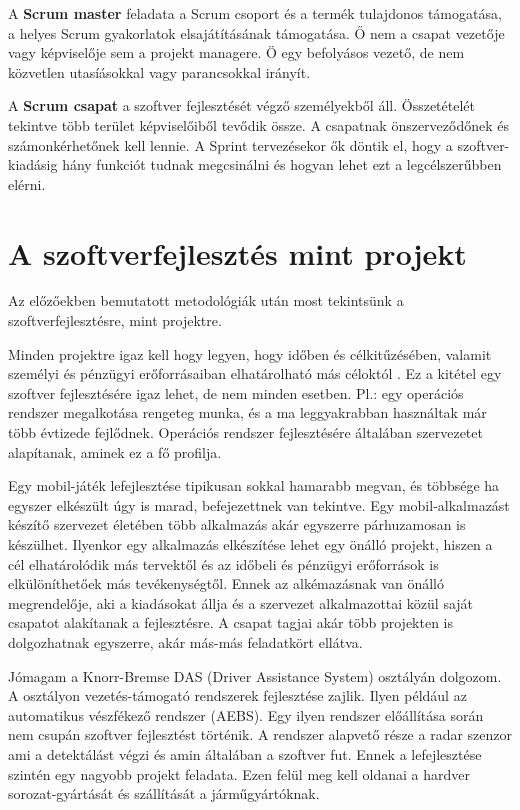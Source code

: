 \documentclass[a4paper,12pt,leqno, notitlepage]{article}%
\begin{document}
A \textbf{Scrum master} feladata a Scrum csoport és a termék tulajdonos támogatása, a helyes Scrum gyakorlatok elsajátításának támogatása. Ő nem a csapat vezetője vagy képviselője sem a projekt managere. Ö egy befolyásos vezető, de nem közvetlen utasíásokkal vagy parancsokkal irányít. \cite{scrum_roles}

A \textbf{Scrum csapat} a szoftver fejlesztését végző személyekből áll. Összetételét tekintve több terület képviselőiből tevődik össze. A csapatnak önszerveződőnek és számonkérhetőnek kell lennie. A Sprint tervezésekor ők döntik el, hogy a szoftver-kiadásig hány funkciót tudnak megcsinálni és hogyan lehet ezt a legcélszerűbben elérni.\cite{scrum_roles}
 
\section{A szoftver\-fejlesztés mint projekt}

Az előzőekben bemutatott metodológiák után most tekintsünk a szoftverfejlesztésre, mint projektre.

Minden projektre igaz kell hogy legyen, hogy időben és célkitűzésében, valamit személyi és pénzügyi erőforrásaiban elhatárolható más céloktól \cite{proj_fogalom}. Ez a kitétel egy szoftver fejlesztésére igaz lehet, de nem minden esetben. Pl.: egy operációs rendszer megalkotása rengeteg munka, és a ma leggyakrabban használtak már több évtizede fejlődnek. Operációs rendszer fejlesztésére általában szervezetet alapítanak, aminek ez a fő profilja. 

Egy mobil-játék lefejlesztése tipikusan sokkal hamarabb megvan, és többsége ha egyszer elkészült úgy is marad, befejezettnek van tekintve. Egy mobil-alkalmazást készítő szervezet életében több alkalmazás akár egyszerre párhuzamosan is készülhet. Ilyenkor egy alkalmazás elkészítése lehet egy önálló projekt, hiszen a cél elhatárolódik más tervektől és az időbeli  és pénzügyi erőforrások is elkülöníthetőek más tevékenységtől. Ennek az alkémazásnak van önálló megrendelője, aki a kiadásokat állja és a szervezet alkalmazottai közül saját csapatot alakítanak a fejlesztésre. A csapat tagjai akár több projekten is dolgozhatnak egyszerre, akár más-más feladatkört ellátva.

Jómagam a Knorr-Bremse DAS (Driver Assistance System) osztályán dolgozom. A osztályon vezetés-támogató rendszerek fejlesztése zajlik. Ilyen például az automatikus vészfékező rendszer (AEBS). Egy ilyen rendszer előállítása során nem csupán szoftver fejlesztést történik. A rendszer alapvető része a radar szenzor ami a detektálást végzi és amin általában a szoftver fut. Ennek a lefejlesztése szintén egy nagyobb projekt feladata. Ezen felül meg kell oldanai a hardver sorozat-gyártását és szállítását a járműgyártóknak.
\end{document}
